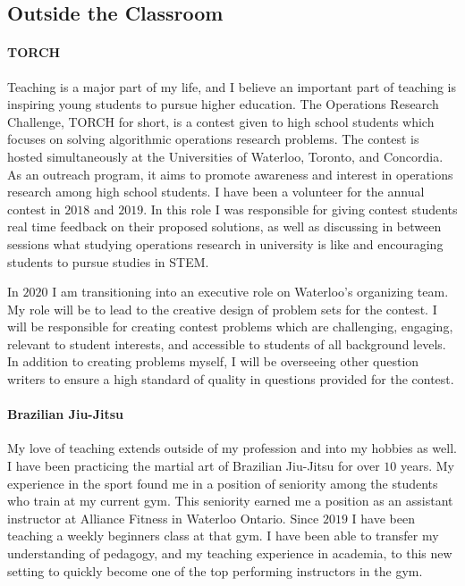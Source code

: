 \documentclass{article}
\begin{document}
\subsection{Outside the Classroom}
\paragraph{TORCH}Teaching is a major part of my life, and I believe an important part of teaching is inspiring young students to pursue higher education. The Operations Research Challenge, TORCH for short, is a contest given to high school students which focuses on solving algorithmic operations research problems. The contest is hosted simultaneously at the Universities of Waterloo, Toronto, and Concordia. As an outreach program, it aims to promote awareness and interest in operations research among high school students. I have been a volunteer for the annual contest in $2018$ and $2019$. In this role I was responsible for giving contest students real time feedback on their proposed solutions, as well as discussing in between sessions what studying operations research in university is like and encouraging students to pursue studies in STEM.

In $2020$ I am transitioning into an executive role on Waterloo's organizing team. My role will be to lead to the creative design of problem sets for the contest. I will be responsible for creating contest problems which are challenging, engaging, relevant to student interests, and accessible to students of all background levels. In addition to creating problems myself, I will be overseeing other question writers to ensure a high standard of quality in questions provided for the contest.

\paragraph{Brazilian Jiu-Jitsu}
My love of teaching extends outside of my profession and into my hobbies as well. I have been practicing the martial art of Brazilian Jiu-Jitsu for over $10$ years. My experience in the sport found me in a position of seniority among the students who train at my current gym. This seniority earned me a position as an assistant instructor at Alliance Fitness in Waterloo Ontario. Since $2019$ I have been teaching a weekly beginners class at that gym. I have been able to transfer my understanding of pedagogy, and my teaching experience in academia, to this new setting to quickly become one of the top performing instructors in the gym. 
\end{document}
